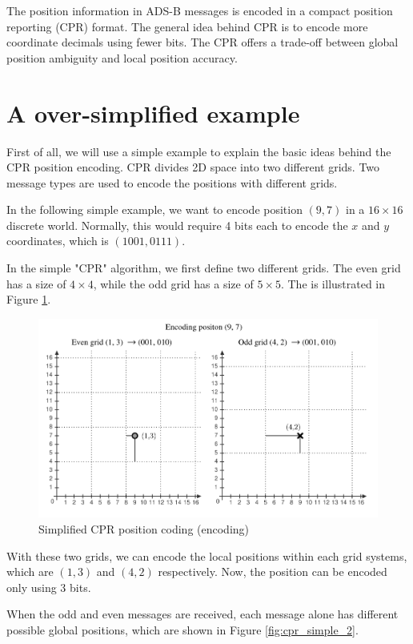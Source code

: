 The position information in ADS-B messages is encoded in a compact position reporting (CPR) format. The general idea behind CPR is to encode more coordinate decimals using fewer bits. The CPR offers a trade-off between global position ambiguity and local position accuracy.


\section{A over-simplified example}
First of all, we will use a simple example to explain the basic ideas behind the CPR position encoding. CPR divides 2D space into two different grids. Two message types are used to encode the positions with different grids.

In the following simple example, we want to encode position $(9, 7)$ in a $16\times16$ discrete world. Normally, this would require 4 bits each to encode the $x$ and $y$ coordinates, which is $(1001, 0111)$.

In the simple "CPR" algorithm, we first define two different grids. The even grid has a size of $4\times4$, while the odd grid has a size of $5\times5$. The is illustrated in Figure \ref{fig:cpr_simple_1}.


\begin{figure}[!ht]
  \includegraphics[width=0.9\linewidth]{figures/adsb/cpr_simple_1.pdf}
  \caption{Simplified CPR position coding (encoding)}
  \label{fig:cpr_simple_1}
\end{figure}

With these two grids, we can encode the local positions within each grid systems, which are $(1,3)$ and $(4,2)$ respectively. Now, the position can be encoded only using 3 bits. 

When the odd and even messages are received, each message alone has different possible global positions, which are shown in Figure \ref{fig:cpr_simple_2}.

